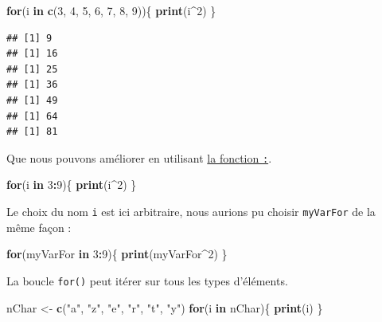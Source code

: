 \documentclass[]{book}
\newenvironment{Shaded}{\begin{snugshade}}{\end{snugshade}}
\newcommand{\ControlFlowTok}[1]{\textcolor[rgb]{0.13,0.29,0.53}{\textbf{#1}}}
\newcommand{\DecValTok}[1]{\textcolor[rgb]{0.00,0.00,0.81}{#1}}
\newcommand{\KeywordTok}[1]{\textcolor[rgb]{0.13,0.29,0.53}{\textbf{#1}}}
\newcommand{\NormalTok}[1]{#1}
\newcommand{\OperatorTok}[1]{\textcolor[rgb]{0.81,0.36,0.00}{\textbf{#1}}}
\newcommand{\StringTok}[1]{\textcolor[rgb]{0.31,0.60,0.02}{#1}}
\begin{document}
\begin{Shaded}
\begin{Highlighting}[]
\ControlFlowTok{for}\NormalTok{(i }\ControlFlowTok{in} \KeywordTok{c}\NormalTok{(}\DecValTok{3}\NormalTok{, }\DecValTok{4}\NormalTok{, }\DecValTok{5}\NormalTok{, }\DecValTok{6}\NormalTok{, }\DecValTok{7}\NormalTok{, }\DecValTok{8}\NormalTok{, }\DecValTok{9}\NormalTok{))\{}
  \KeywordTok{print}\NormalTok{(i}\OperatorTok{^}\DecValTok{2}\NormalTok{)}
\NormalTok{\}}
\end{Highlighting}
\end{Shaded}

\begin{verbatim}
## [1] 9
## [1] 16
## [1] 25
## [1] 36
## [1] 49
## [1] 64
## [1] 81
\end{verbatim}

Que nous pouvons améliorer en utilisant \protect\hyperlink{l0152points}{la fonction \texttt{:}}.

\begin{Shaded}
\begin{Highlighting}[]
\ControlFlowTok{for}\NormalTok{(i }\ControlFlowTok{in} \DecValTok{3}\OperatorTok{:}\DecValTok{9}\NormalTok{)\{}
  \KeywordTok{print}\NormalTok{(i}\OperatorTok{^}\DecValTok{2}\NormalTok{)}
\NormalTok{\}}
\end{Highlighting}
\end{Shaded}

Le choix du nom \texttt{i} est ici arbitraire, nous aurions pu choisir \texttt{myVarFor} de la même façon :

\begin{Shaded}
\begin{Highlighting}[]
\ControlFlowTok{for}\NormalTok{(myVarFor }\ControlFlowTok{in} \DecValTok{3}\OperatorTok{:}\DecValTok{9}\NormalTok{)\{}
  \KeywordTok{print}\NormalTok{(myVarFor}\OperatorTok{^}\DecValTok{2}\NormalTok{)}
\NormalTok{\}}
\end{Highlighting}
\end{Shaded}

La boucle \texttt{for()} peut itérer sur tous les types d'éléments.

\begin{Shaded}
\begin{Highlighting}[]
\NormalTok{nChar <-}\StringTok{ }\KeywordTok{c}\NormalTok{(}\StringTok{"a"}\NormalTok{, }\StringTok{"z"}\NormalTok{, }\StringTok{"e"}\NormalTok{, }\StringTok{"r"}\NormalTok{, }\StringTok{"t"}\NormalTok{, }\StringTok{"y"}\NormalTok{)}
\ControlFlowTok{for}\NormalTok{(i }\ControlFlowTok{in}\NormalTok{ nChar)\{}
  \KeywordTok{print}\NormalTok{(i)}
\NormalTok{\}}
\end{Highlighting}
\end{Shaded}
\end{document}
